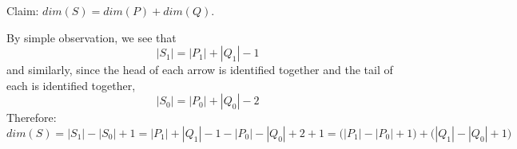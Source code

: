 \documentclass{article}
\begin{document}
Claim: $dim(S)=dim(P)+dim(Q)$.\\
\begin{framed}
By simple observation, we see that  $$|S_1|=|P_1|+|Q_1|-1$$
and similarly, since the head of each arrow is identified together 
and the tail of each is identified together, $$|S_0|=|P_0|+|Q_0|-2$$
Therefore: 
$$dim(S)=|S_1|-|S_0|+1=
|P_1|+|Q_1|-1-|P_0|-|Q_0|+2+1=\big(|P_1|-|P_0|+1\big)+\big(|Q_1|-|Q_0|+1\big)$$
\end{framed}
\end{document}
